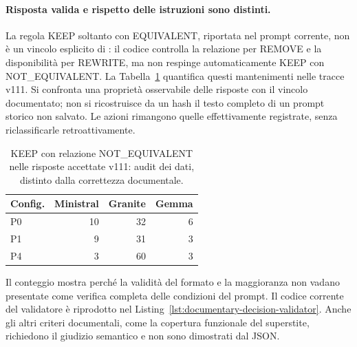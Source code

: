\paragraph{Risposta valida e rispetto delle istruzioni sono distinti.}
La regola KEEP soltanto con EQUIVALENT, riportata nel prompt corrente,
non \`e un vincolo esplicito di : il codice
controlla la relazione per REMOVE e la disponibilit\`a per REWRITE,
ma non respinge automaticamente KEEP con NOT\_EQUIVALENT.
La Tabella~\ref{tab:keep-relationship-audit} quantifica questi mantenimenti
nelle tracce v111. Si confronta una propriet\`a osservabile delle risposte
con il vincolo documentato; non si ricostruisce da un hash il testo
completo di un prompt storico non salvato. Le azioni rimangono quelle
effettivamente registrate, senza riclassificarle retroattivamente.
\begin{table}[!htbp]
\centering\small
\caption{KEEP con relazione NOT\_EQUIVALENT nelle risposte accettate v111: audit dei dati, distinto dalla correttezza documentale.}\label{tab:keep-relationship-audit}
\begin{tabular}{lrrr}
\toprule
Config. & Ministral & Granite & Gemma \\
\midrule
P0 & 10 & 32 & 6 \\
P1 & 9 & 31 & 3 \\
P4 & 3 & 60 & 3 \\
\bottomrule
\end{tabular}
\end{table}
Il conteggio mostra perch\'e la validit\`a del formato e la maggioranza
non vadano presentate come verifica completa delle condizioni del prompt.
Il codice corrente del validatore \`e riprodotto nel
Listing~\ref{lst:documentary-decision-validator}.
Anche gli altri criteri documentali, come la copertura funzionale del
superstite, richiedono il giudizio semantico e non sono dimostrati dal JSON.

